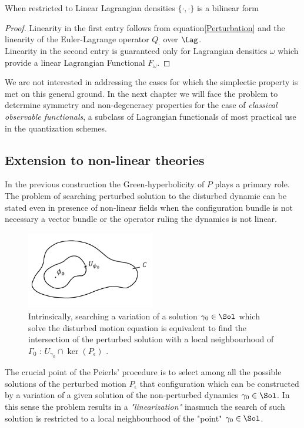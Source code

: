 \documentclass[Main]{subfiles}
\begin{document}
		\begin{proposition}[Bilinearity]
			When restricted to Linear Lagrangian densities $\{\cdot,\cdot\}$ is a bilinear form
		\end{proposition}
		\begin{proof}
			Linearity in the first entry follows from equation\ref{Perturbation} and the linearity of the Euler-Lagrange operator $Q_\cdot$ over $\Lag$.
			\\
			Linearity in the second entry is guaranteed only for Lagrangian densities $\omega$ which provide a linear Lagrangian Functional $F_\omega$.
		\end{proof}
		We are not interested in addressing the cases for which the simplectic property is met on this general ground. 
		In the next chapter we will face the problem to determine  symmetry and non-degeneracy properties for the case of  \emph{classical observable functionals}, a subclass of Lagrangian functionals of most practical use in the quantization schemes.

	\subsection{Extension to non-linear theories}\label{Section:NonLinearPeierls}
		In the previous construction the Green-hyperbolicity of $P$ plays a primary role.
		The problem of searching perturbed solution to the disturbed dynamic can be stated even in presence  of non-linear fields  when the configuration bundle is not necessary a vector bundle or the operator ruling the dynamics is not linear.
		\begin{figure}[h!]
				  \centering
			   	\includegraphics[width=0.5\textwidth]{Pictures/Linearization} 
   	  			\caption{Intrinsically, searching a variation of a solution $\gamma_0\in \Sol$ which solve the disturbed motion equation is equivalent to find the intersection of the perturbed solution with a local neighbourhood of $\Gamma_0$ : $U_{\gamma_0}\cap\ker(P_\epsilon)$ .}
		\end{figure}		
		
		The crucial point of the Peierls' procedure  is to select among all the possible solutions of the perturbed motion $P_\epsilon$ that configuration which can be constructed by a variation of a given solution of the non-perturbed dynamics $\gamma_0 \in \Sol$.
		In this sense the problem results in a \emph{"linearization"} inasmuch the  search of such solution is restricted to a local neighbourhood of the "point" $\gamma_0\in \Sol$.
\end{document}

